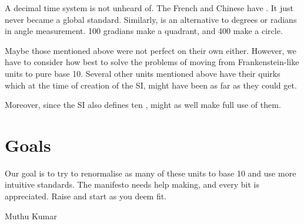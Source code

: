 A decimal time system is not unheard of. The French and Chinese have . It just never became a global standard. Similarly,  is an alternative to degrees or radians in angle measurement. 100 gradians make a quadrant, and 400 make a circle.

Maybe those mentioned above were not perfect on their own either. However, we have to consider how best to solve the problems of moving from Frankenstein-like units to pure base 10. Several other units mentioned above have their quirks which at the time of creation of the SI, might have been as far as they could get.

Moreover, since the SI also defines ten  , might as well make full use of them.

\section*{Goals}
Our goal is to try to renormalise as many of these units to base 10 and use more intuitive standards. The  manifesto needs help making, and every bit is appreciated. Raise  and start  as you deem fit.

\medskip
\begin{flushright}
  Muthu Kumar
\end{flushright}
